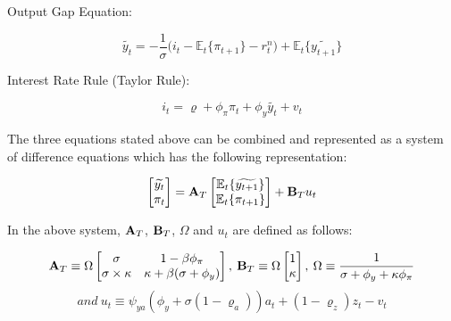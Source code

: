 \documentclass[12pt]{article}
\newcommand{\1}{\mathbbm 1}
\renewcommand{\rho}{\varrho}
\begin{document}
Output Gap Equation:

	\begin{equation}
	\widetilde{y_{t}} = -\frac{1}{\sigma} \big(i_{t} - \mathbb{E}_{t}\{\pi_{t+1}\} - r_{t}^{n}\big) + \mathbb{E}_{t}\{\widetilde{y_{t+1}}\}
\end{equation}

Interest Rate Rule (Taylor Rule):

\begin{equation}
	i_{t} = \rho + \phi_{\pi} \pi_{t} + \phi_{y} \widetilde{y_{t}} + v_{t} 
\end{equation}


The three equations stated above can be combined and represented as a system of difference equations which has the following representation:


	\begin{equation}
		\begin{bmatrix}
			\widetilde{y_{t}}  \\
			\pi_{t} \\
		\end{bmatrix} = {\bf{A}}_{T} \begin{bmatrix}
		\mathbb{E}_{t}\{\widetilde{y_{t+1}}\}  \\
		\mathbb{E}_{t}\{{\pi_{t+1}}\} \end{bmatrix} + {\bf{B}}_{T} u_{t} \\
	\end{equation}


In the above system, ${\bf{A}}_{T}$, ${\bf{B}}_{T}$, $\Omega$ and $u_{t}$ are defined as follows:

	\begin{equation*}
		{\bf{A}}_{T} \equiv \Omega 
		\begin{bmatrix}
			\sigma & 1 - \beta \phi_{\pi}  \\
			\sigma \times \kappa & \kappa + \beta (\sigma + \phi_{y}) \\
		\end{bmatrix}, \:
		{\bf{B}}_{T} \equiv \Omega \begin{bmatrix}
			1 \\
			\kappa \\
		\end{bmatrix}, \: \Omega \equiv \frac{1}{\sigma + \phi_{y} + \kappa \phi_{\pi}}
	\end{equation*}
\begin{equation*}
and \: u_{t} \equiv \psi_{ya}(\phi_{y} + \sigma (1 - \rho_{a}))a_{t} + (1 - \rho_{z})z_{t} - v_{t}
\end{equation*}
\end{document}
